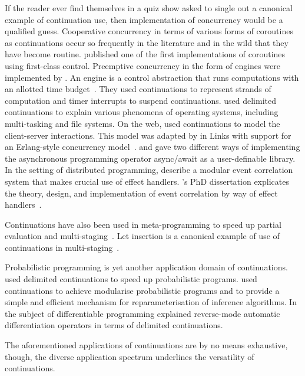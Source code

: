 \documentclass[12pt,phd,lfcs,twoside,openright,logo,leftchapter,normalheadings]{infthesis}
\theoremstyle{plain}
\theoremstyle{definition}
\begin{document}
If the reader ever find themselves in a quiz show asked to single out
a canonical example of continuation use, then implementation of
concurrency would be a qualified guess. Cooperative concurrency in
terms of various forms of coroutines as continuations occur so
frequently in the literature and in the wild that they have become
routine.
%
\citet{HaynesFW86} published one of the first implementations of
coroutines using first-class control.
%
Preemptive concurrency in the form of engines were implemented by
\citet{DybvigH89}. An engine is a control abstraction that runs
computations with an allotted time budget~\cite{HaynesF84}. They used
continuations to represent strands of computation and timer interrupts
to suspend continuations.
%
\citet{KiselyovS07a} used delimited continuations to explain various
phenomena of operating systems, including multi-tasking and file
systems.
%
On the web, \citet{Queinnec04} used continuations to model the
client-server interactions. This model was adapted by
\citet{CooperLWY06} in Links with support for an Erlang-style
concurrency model~\cite{ArmstrongVW93}.
%
\citet{Leijen17a} and \citet{DolanEHMSW17} gave two different ways of
implementing the asynchronous programming operator async/await as a
user-definable library.
%
In the setting of distributed programming, \citet{BracevacASEEM18}
describe a modular event correlation system that makes crucial use of
effect handlers.  \citeauthor{Bracevec19}'s PhD dissertation
explicates the theory, design, and implementation of event correlation
by way of effect handlers~\cite{Bracevec19}.

Continuations have also been used in meta-programming to speed up
partial evaluation and
multi-staging~\cite{LawallD94,KameyamaKS11,OishiK17,Yallop17,WeiBTR20}. Let
insertion is a canonical example of use of continuations in
multi-staging~\cite{Yallop17}.

Probabilistic programming is yet another application domain of
continuations.  \citet{KiselyovS09} used delimited continuations to
speed up probabilistic programs. \citet{GorinovaMH20} used
continuations to achieve modularise probabilistic programs and to
provide a simple and efficient mechanism for reparameterisation of
inference algorithms.
%
In the subject of differentiable programming \citet{WangZDWER19}
explained reverse-mode automatic differentiation operators in terms of
delimited continuations.

The aforementioned applications of continuations are by no means
exhaustive, though, the diverse application spectrum underlines the
versatility of continuations.
\end{document}
